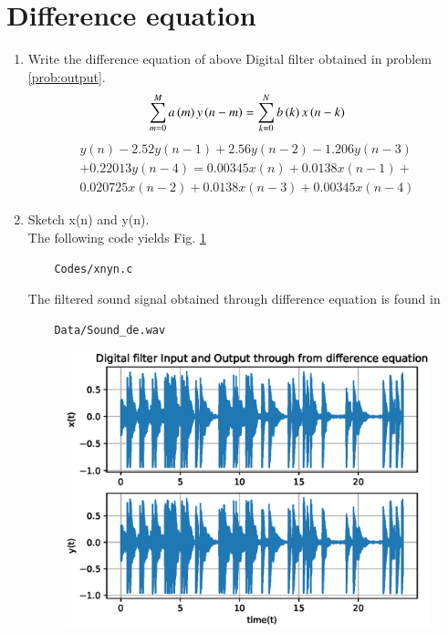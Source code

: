 \documentclass[journal,12pt,twocolumn]{IEEEtran}
\renewcommand\thesection{\arabic{section}}
\begin{document}
\section{Difference equation}
\begin{enumerate}[label=\thesection.\arabic*,ref=\thesection.\theenumi]

\item
\label{prob:diff_eq}
Write the difference equation of above Digital filter obtained in problem \ref{prob:output}.
\\
\solution
\begin{equation}
\label{eq:iir_filter_gen}
 \sum _{m=0}^{M}a\left(m\right)y\left(n-m\right)=\sum _{k=0}^{N}b\left(k\right)x\left(n-k\right)
\end{equation}
\begin{equation}
\label{eq:diff_eqn}
\begin{split}
y(n) - 2.52y(n-1) + 2.56y(n-2) - 1.206y(n-3)
\\
+ 0.22013y(n-4) = 0.00345x(n) + 0.0138x(n-1) +
\\
 0.020725x(n-2) + 0.0138x(n-3) + 0.00345x(n-4)
\end{split}
\end{equation}
\item
\label{prob:xnyn_plot1}
Sketch x(n) and y(n).
\\
\solution
The following code yields Fig. \ref{fig:xnyn}
\begin{lstlisting}
    Codes/xnyn.c
\end{lstlisting}
The filtered sound signal obtained through difference equation is found in
\begin{lstlisting}
    Data/Sound_de.wav
\end{lstlisting}
\begin{figure}[!ht]
\begin{center}
\includegraphics[width=\columnwidth]{./figs/xnyn}
\end{center}
\label{fig:xnyn}	
\end{figure}

\end{enumerate}
\end{document}
